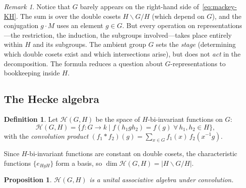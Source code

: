 \documentclass[12pt,a4paper]{article}
\newtheorem{proposition}[theorem]{Proposition}
\theoremstyle{definition}
\newtheorem{definition}[theorem]{Definition}
\theoremstyle{remark}
\newtheorem{remark}[theorem]{Remark}
\newcommand{\Hecke}{\mathcal{H}}
\begin{document}
\begin{remark}\label{rem:G-disappears}
Notice that $G$ barely appears on the right-hand side
of~\eqref{eq:mackey-KH}. The sum is over the double cosets
$H \backslash G / H$ (which depend on $G$), and the conjugation
$g \cdot M$ uses an element $g \in G$. But every operation on
representations---the restriction, the induction, the subgroups
involved---takes place entirely within $H$ and its subgroups.
The ambient group $G$ sets the \emph{stage} (determining which double
cosets exist and which intersections arise), but does not
\emph{act} in the decomposition. The formula reduces a question about
$G$-representations to bookkeeping inside $H$.
\end{remark}

\subsection{The Hecke algebra}

\begin{definition}\label{def:hecke}
Let $\Hecke(G, H)$ be the space of $H$-bi-invariant functions on $G$:
\[
  \Hecke(G, H) = \{f : G \to k \mid f(h_1 g h_2) = f(g)
  \;\forall\, h_1, h_2 \in H\},
\]
with the \emph{convolution product}
$(f_1 * f_2)(g) = \sum_{x \in G} f_1(x)\, f_2(x^{-1}g)$.
\end{definition}

Since $H$-bi-invariant functions are constant on double cosets, the
characteristic functions $\{e_{HgH}\}$ form a basis, so
$\dim \Hecke(G, H) = |H \backslash G / H|$.

\begin{proposition}\label{prop:hecke-algebra}
$\Hecke(G, H)$ is a unital associative algebra under convolution.
\end{proposition}
\end{document}

